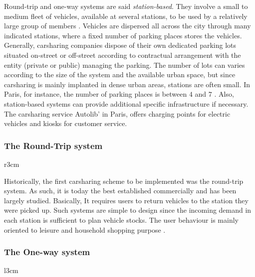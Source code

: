 \begin{bibunit}[ieeetr]
\medskip
Round-trip and one-way systems are said \textit{station-based}.
They involve a small to medium fleet of vehicles, available at several stations, to be used by a relatively large group of members \cite{shaheen_short_1999}.
Vehicles are dispersed all across the city through many indicated stations, where a fixed number of parking places stores the vehicles.
Generally, carsharing companies dispose of their own dedicated parking lots situated on-street or off-street according to contractual arrangement with the entity (private or public) managing the parking.
The number of lots can varies according to the size of the system and the available urban space, but since carsharing is mainly implanted in dense urban areas, stations are often small.
In Paris, for instance, the number of parking places is between $4$ and $7$ \cite{autolib_rapport_2014}.
Also, station-based systems can provide additional specific infrastructure if necessary.
The carsharing service Autolib' in Paris, offers charging points for electric vehicles and kiosks for customer service.


\subsubsection{The Round-Trip system}
\begin{wrapfigure}[6]{r}{3cm}
\vspace{-.4cm}
\end{wrapfigure}
Historically, the first carsharing scheme to be implemented was the round-trip system.
As such, it is today the best established commercially and has been largely studied.
Basically, It requires users to return vehicles to the station they were picked up.
Such systems are simple to design since the incoming demand in each station is sufficient to plan vehicle stocks.
The user behaviour is mainly oriented to leisure and household shopping purpose \cite{barth_shared_use_2002, costain_synopsis_2012}.


\subsubsection{The One-way system}

\begin{wrapfigure}[6]{l}{3cm}
\vspace{-.4cm}
\centering
{}
\end{wrapfigure}


\end{bibunit}
